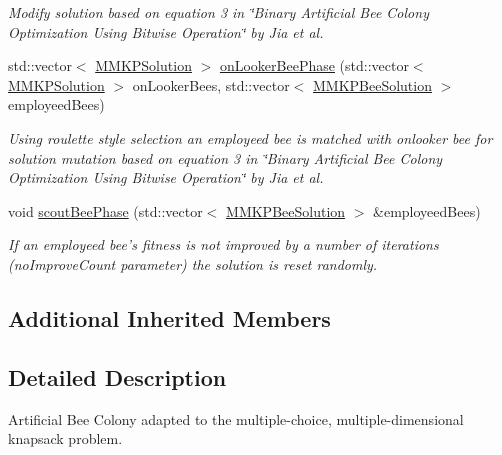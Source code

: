 \begin{DoxyCompactItemize}
\begin{DoxyCompactList}\small\item\em Modify solution based on equation 3 in \char`\"{}\+Binary Artificial Bee Colony 
\+Optimization Using Bitwise Operation\char`\"{} by Jia et al. \end{DoxyCompactList}\item 
\hypertarget{class_m_m_k_p___a_b_c_aa96e1b6432335c101c1ed05637b7c9ac}{std\+::vector$<$ \hyperlink{class_m_m_k_p_solution}{M\+M\+K\+P\+Solution} $>$ \hyperlink{class_m_m_k_p___a_b_c_aa96e1b6432335c101c1ed05637b7c9ac}{on\+Looker\+Bee\+Phase} (std\+::vector$<$ \hyperlink{class_m_m_k_p_solution}{M\+M\+K\+P\+Solution} $>$ on\+Looker\+Bees, std\+::vector$<$ \hyperlink{struct_m_m_k_p_bee_solution}{M\+M\+K\+P\+Bee\+Solution} $>$ employeed\+Bees)}\label{class_m_m_k_p___a_b_c_aa96e1b6432335c101c1ed05637b7c9ac}

\begin{DoxyCompactList}\small\item\em Using roulette style selection an employeed bee is matched with onlooker bee for solution mutation based on equation 3 in \char`\"{}\+Binary Artificial Bee Colony Optimization Using Bitwise 
\+Operation\char`\"{} by Jia et al. \end{DoxyCompactList}\item 
\hypertarget{class_m_m_k_p___a_b_c_aa1f9ebd197fc64d3eac899fa2c9fc5c1}{void \hyperlink{class_m_m_k_p___a_b_c_aa1f9ebd197fc64d3eac899fa2c9fc5c1}{scout\+Bee\+Phase} (std\+::vector$<$ \hyperlink{struct_m_m_k_p_bee_solution}{M\+M\+K\+P\+Bee\+Solution} $>$ \&employeed\+Bees)}\label{class_m_m_k_p___a_b_c_aa1f9ebd197fc64d3eac899fa2c9fc5c1}

\begin{DoxyCompactList}\small\item\em If an employeed bee's fitness is not improved by a number of iterations (no\+Improve\+Count parameter) the solution is reset randomly. \end{DoxyCompactList}\end{DoxyCompactItemize}
\subsection*{Additional Inherited Members}


\subsection{Detailed Description}
Artificial Bee Colony adapted to the multiple-\/choice, multiple-\/dimensional knapsack problem. 

